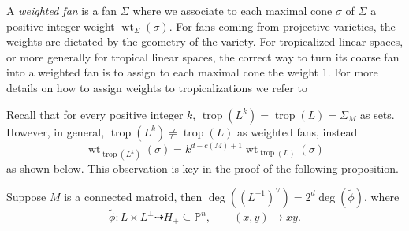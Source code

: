 \documentclass[12pt,a4paper,english]{scrartcl}
\newcommand{\ZZ}{\mathbb{Z}}
\newcommand{\RR}{\mathbb{R}}
\DeclareMathOperator{\weight}{wt}
\DeclareMathOperator{\trop}{trop}
\begin{document}

A \textit{weighted fan} is a fan $\Sigma$ where we associate to each maximal cone $\sigma$ of $\Sigma$ a positive integer weight $\weight_\Sigma(\sigma)$.
For fans coming from projective varieties, the weights  are dictated by the geometry of the variety. For tropicalized linear spaces, or more generally for tropical linear spaces, the correct way to turn
its coarse fan into a weighted fan is to assign to each maximal cone the weight 1. For more details on how to assign weights to tropicalizations we refer to \cite[Section 3.4]{Maclagan2015}

Recall that for every positive integer $k$, $\trop(L^k) = \trop(L) = \Sigma_M$ as sets. However, in general, $\trop(L^k) \neq \trop(L)$ as weighted fans, instead
\[
\weight_{\trop(L^k)}(\sigma) = k^{d-c(M)+1}\weight_{\trop(L)}(\sigma)
\]
as shown below. This observation is key in the proof of the following proposition.

\begin{proposition}\label{prop: redStep1}
Suppose $M$ is a connected matroid, then $\deg ((L^{-1})^\vee) = 2^{d} \deg(\widetilde{\phi})$, where
\[
\widetilde{\phi}: L\times L^{\perp} \dashrightarrow H_+ \subseteq  \mathbb{P}^n, \qquad (x, y) \mapsto xy.
\]
\end{proposition}
\end{document}
